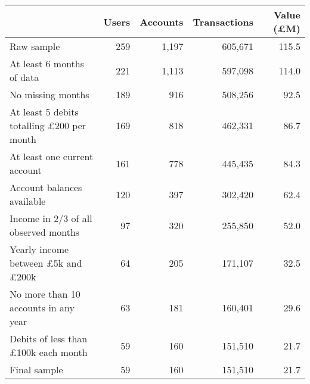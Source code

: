 \begin{tabular}{lrrrr}
\toprule
                                                 & Users & Accounts & Transactions & Value (\pounds M) \\
\midrule
                                      Raw sample &   259 &    1,197 &      605,671 &             115.5 \\
                       At least 6 months of data &   221 &    1,113 &      597,098 &             114.0 \\
                               No missing months &   189 &      916 &      508,256 &              92.5 \\
At least 5 debits totalling \pounds200 per month &   169 &      818 &      462,331 &              86.7 \\
                    At least one current account &   161 &      778 &      445,435 &              84.3 \\
                      Account balances available &   120 &      397 &      302,420 &              62.4 \\
            Income in 2/3 of all observed months &    97 &      320 &      255,850 &              52.0 \\
 Yearly income between \pounds5k and \pounds200k &    64 &      205 &      171,107 &              32.5 \\
            No more than 10 accounts in any year &    63 &      181 &      160,401 &              29.6 \\
      Debits of less than \pounds100k each month &    59 &      160 &      151,510 &              21.7 \\
                                    Final sample &    59 &      160 &      151,510 &              21.7 \\
\bottomrule
\end{tabular}

